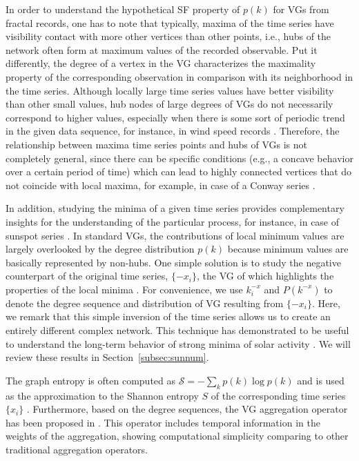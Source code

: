 		In order to understand the hypothetical SF property of $p(k)$ for VGs from fractal records, one has to note that typically, maxima of the time series have visibility contact with more other vertices than other points, i.e., hubs of the network often form at maximum values of the recorded observable. Put it differently, the degree of a vertex in the VG characterizes the maximality property of the corresponding observation in comparison with its neighborhood in the time series. Although locally large time series values have better visibility than other small values, hub nodes of large degrees of VGs do not necessarily correspond to higher values, especially when there is some sort of periodic trend in the given data sequence, for instance, in wind speed records \cite{Pierini2012,Zou2014a}. Therefore, the relationship between maxima time series points and hubs of VGs is not completely general, since there can be specific conditions (e.g., a concave behavior over a certain period of time) which can lead to highly connected vertices that do not coincide with local maxima, for example, in case of a Conway series \cite{Lacasa2008}. 
				
		In addition, studying the minima of a given time series provides complementary insights for the understanding of the particular process, for instance, in case of sunspot series \cite{Zou2014a}. In standard VGs, the contributions of local minimum values are largely overlooked by the degree distribution $p(k)$ because minimum values are basically represented by non-hubs. One simple solution is to study the negative counterpart of the original time series, $\{-x_i\}$, the VG of which highlights the properties of the local minima \cite{Zou2014a}. For convenience, we use $k^{-x}_i$ and $P(k^{-x})$ to denote the degree sequence and distribution of VG resulting from $\{-x_i\}$. Here, we remark that this simple inversion of the time series allows us to create an entirely different complex network. This technique has demonstrated to be useful to understand the long-term behavior of strong minima of solar activity \cite{Zou2014a}. We will review these results in Section~\ref{subsec:sunnum}. 
		
		The graph entropy is often computed as $\mathcal{S} = - \sum_{k} p(k) \log p(k)$ and is used as the approximation to the Shannon entropy $S$ of the corresponding time series $\{x_i\}$ \cite{Luque2016,Goncalves2016}. Furthermore, based on the degree sequences, the VG aggregation operator has been proposed in \cite{Chen2014,Jiang2016}. This operator includes temporal information in the weights of the aggregation, showing computational simplicity comparing to other traditional aggregation operators.  
					
